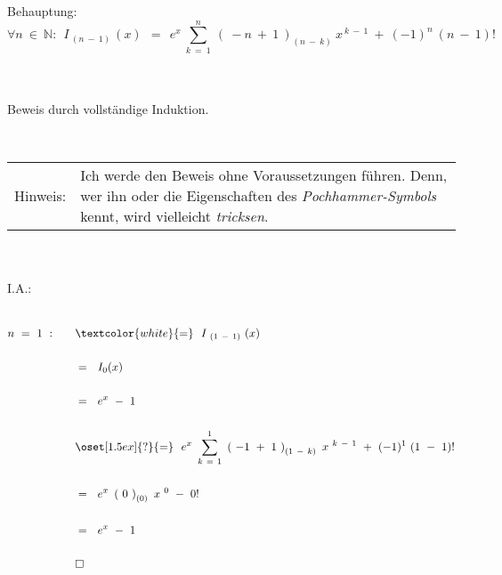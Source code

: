 	\newpage
	
	Behauptung: \\
	
	\[ \forall n ~ \in ~ \mathbb{N}: ~~ I_{~ (n ~ - ~ 1) ~} (x) ~~ = ~~ e^x ~ \sum_{k ~ = ~ 1}^{n} ~ \left( ~ -n ~ + ~ 1 ~ \right)_{(n ~ - ~ k)} ~ x^{~ k ~ - ~ 1} ~ + ~ (-1)^n ~ (n ~ - ~ 1)! \]
	
	~\\
	~\\
	
	Beweis durch vollständige Induktion.
	
	~\\
	
	\begin{tabularx}{\textwidth}{rX}
		
		Hinweis:  & Ich werde den Beweis ohne Voraussetzungen führen. Denn, wer ihn oder die Eigenschaften des \textit{Pochhammer-Symbols} kennt, wird vielleicht \textit{tricksen}. \\
		
	\end{tabularx}
	
	~\\
	~\\
	
	I.A.:
	
	~\\
	
$\begin{aligned}[t]
	n ~ = ~ 1 ~ : \qquad &\textcolor{white}{=} ~~ I_{~ (1 ~ - ~ 1) ~} (x) \\ \\
	&= ~~ I_0(x) \\ \\
	&= ~~ e^x ~ - ~ 1 \\ \\
	&\oset[1.5ex]{?}{=} ~~ e^x ~ \sum_{k ~ = ~ 1}^{1} ~ \left( ~ -1 ~ + ~ 1 ~ \right)_{(1 ~ - ~ k)} ~ x^{~ k ~ - ~ 1} ~ + ~ (-1)^1 ~ (1 ~ - ~ 1)! \\ \\
	&= ~~ e^x ~ \left( ~ 0 ~ \right)_{(0)} ~ x^{~ 0} ~ - ~ 0! \\ \\
	&= ~~ e^x ~ - ~ 1 \\ \\
	&\square
\end{aligned}$

	\newpage
	
